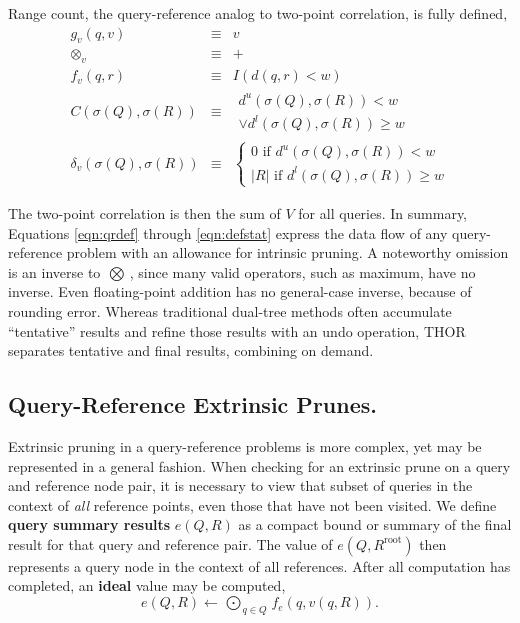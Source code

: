 \documentclass[twoside,leqno,twocolumn]{article}
\newcommand{\summary}{\delta}
\newcommand{\mysub}[1]{\subsection{#1.}}
\newcommand{\defterm}[1]{{\bf #1}}
\newcommand{\kdroot}[1]{#1^{\text{root}}}
\newcommand{\lo}[1]{#1^{l}}
\newcommand{\up}[1]{#1^{u}}
\newcommand{\distlo}{\lo{d}}
\newcommand{\distup}{\up{d}}
\newcommand{\dist}[2]{d(#1,#2)}
\newcommand{\nameOp}[2]{\mathop{#1\nolimits\!\!_{#2}}}
\newcommand{\nameop}[2]{#1_{\!#2}}
\newcommand{\myOp}[1]{\nameOp{\bigotimes}{#1}}
\newcommand{\myop}[1]{\nameop{\otimes}{#1}}
\newcommand{\letterqr}{v}
\newcommand{\outqr}{V}
\newcommand{\inqr}{v}
\newcommand{\Opqr}{\myOp{\letterqr}}
\newcommand{\opqr}{\myop{\letterqr}}
\newcommand{\fqr}{f_{\letterqr}}
\newcommand{\gqr}{g_{\letterqr}}
\newcommand{\letterqrv}{v}
\newcommand{\deltaqrv}{\summary_{\letterqrv}}
\newcommand{\canpruneqrv}{C}%
\newcommand{\lettermu}{e}
\newcommand{\inmu}{e}
\newcommand{\Outopmu}{\nameOp{\bigodot}{\lettermu}}%
\newcommand{\fmu}{f_{\lettermu}}
\newcommand{\outstat}{\sigma}
\begin{document}
\noindent
Range count, the query-reference analog to two-point correlation, is fully defined,
\begin{eqnarray*}
\gqr(q, \inqr) &\equiv& \inqr
\\
\opqr &\equiv& +
\\
\fqr(q,r) &\equiv& I(\dist{q}{r} < w)
\\
\canpruneqrv(\outstat(Q), \outstat(R))
&\equiv&
\begin{array}{l}\distup(\outstat(Q),\outstat(R)) < w \\ \vee \distlo(\outstat(Q),\outstat(R)) \geq w\end{array}
\\
\deltaqrv(\outstat(Q),\outstat(R)) &\equiv& \left\{ \begin{array}{l} 0 \text{ if } \distup(\outstat(Q),\outstat(R)) < w \\ |R| \text{ if } \distlo(\outstat(Q),\outstat(R)) \geq w \end{array}\right.
\end{eqnarray*}

\noindent
The two-point correlation is then the sum of $\outqr$ for all queries.
In summary, Equations \ref{eqn:qrdef} through \ref{eqn:defstat} express the data flow of any query-reference problem with an allowance for intrinsic pruning.
A noteworthy omission is an inverse to $\Opqr$, since many valid operators, such as maximum, have no inverse.
Even floating-point addition has no general-case inverse, because of rounding error.
Whereas traditional dual-tree methods often accumulate ``tentative'' results and refine those results with an undo operation, THOR separates tentative and final results, combining on demand.

\mysub{Query-Reference Extrinsic Prunes}

Extrinsic pruning in a query-reference problems is more complex, yet may be represented in a general fashion.
When checking for an extrinsic prune on a query and reference node pair, it is necessary to view that subset of queries in the context of {\em all} reference points, even those that have not been visited.
We define \defterm{query summary results} $\inmu(Q, R)$ as a compact bound or summary of the final result for that query and reference pair.
The value of $\inmu(Q, \kdroot{R})$ then represents a query node in the context of all references.
After all computation has completed, an \defterm{ideal} value may be computed,
\begin{equation*}
\inmu(Q, R) \gets \Outopmu_{q \in Q} \fmu(q, \inqr(q, R)).
\end{equation*}
\end{document}
